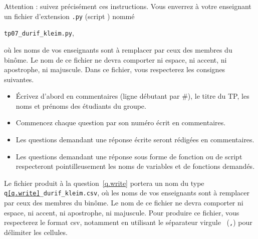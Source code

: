 Attention : suivez précisément ces instructions. Vous enverrez à votre enseignant un fichier d'extension  \texttt{.py} (script \python) nommé
\begin{center}
  \texttt{tp07\_durif\_kleim.py},
\end{center}
 où les noms de vos enseignants sont à remplacer par ceux des membres du binôme. Le nom de ce 
fichier ne devra comporter ni espace, ni accent, ni apostrophe, ni majuscule.
Dans ce fichier, vous respecterez les consignes suivantes.
\begin{itemize}
  \item \'Ecrivez d'abord en commentaires (ligne débutant par \#), le titre du TP, les noms et prénoms des étudiants du groupe.
  \item Commencez chaque question par son numéro écrit en commentaires.
  \item Les questions demandant une réponse écrite seront rédigées en commentaires.
  \item Les questions demandant une réponse sous forme de fonction ou de script respecteront pointilleusement les noms de variables et de fonctions demandés.
\end{itemize}

Le fichier produit à la question~\ref{q.write}  portera un nom du type \texttt{q\ref{q.write}\_durif\_kleim.csv}, où les noms de vos enseignants sont à remplacer par ceux des membres du binôme. Le nom de ce fichier ne devra comporter ni espace, ni accent, ni apostrophe, ni majuscule. 
Pour produire ce fichier, vous respecterez le format csv, notamment en utilisant le séparateur \og virgule \fg\ (\texttt{,}) pour délimiter les cellules. 